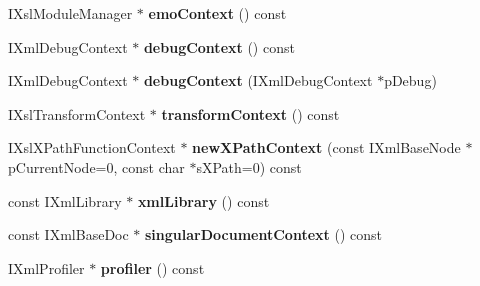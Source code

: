 \begin{DoxyCompactItemize}
\item 
\hypertarget{classgeneral__server_1_1QueryEnvironment_a128e180237d71a0d4919be2be7468f05}{\-I\-Xsl\-Module\-Manager $\ast$ {\bfseries emo\-Context} () const }\label{classgeneral__server_1_1QueryEnvironment_a128e180237d71a0d4919be2be7468f05}

\item 
\hypertarget{classgeneral__server_1_1QueryEnvironment_a4bb9bbd6249202f4fd58df2c72ed5f75}{\-I\-Xml\-Debug\-Context $\ast$ {\bfseries debug\-Context} () const }\label{classgeneral__server_1_1QueryEnvironment_a4bb9bbd6249202f4fd58df2c72ed5f75}

\item 
\hypertarget{classgeneral__server_1_1QueryEnvironment_af2bd83aeed31f536b3fc9d839cd812f8}{\-I\-Xml\-Debug\-Context $\ast$ {\bfseries debug\-Context} (\-I\-Xml\-Debug\-Context $\ast$p\-Debug)}\label{classgeneral__server_1_1QueryEnvironment_af2bd83aeed31f536b3fc9d839cd812f8}

\item 
\hypertarget{classgeneral__server_1_1QueryEnvironment_a75d567a5714bf37268b0d677b1d49041}{\-I\-Xsl\-Transform\-Context $\ast$ {\bfseries transform\-Context} () const }\label{classgeneral__server_1_1QueryEnvironment_a75d567a5714bf37268b0d677b1d49041}

\item 
\hypertarget{classgeneral__server_1_1QueryEnvironment_a36994b58b83c51a1abd9ba9140cf0a9d}{\-I\-Xsl\-X\-Path\-Function\-Context $\ast$ {\bfseries new\-X\-Path\-Context} (const \-I\-Xml\-Base\-Node $\ast$p\-Current\-Node=0, const char $\ast$s\-X\-Path=0) const }\label{classgeneral__server_1_1QueryEnvironment_a36994b58b83c51a1abd9ba9140cf0a9d}

\item 
\hypertarget{classgeneral__server_1_1QueryEnvironment_ae158b66ec89f7d22e942f0e387b21e63}{const \-I\-Xml\-Library $\ast$ {\bfseries xml\-Library} () const }\label{classgeneral__server_1_1QueryEnvironment_ae158b66ec89f7d22e942f0e387b21e63}

\item 
\hypertarget{classgeneral__server_1_1QueryEnvironment_a54831f0f41cf3768f7ebb8ad7ae4e1fb}{const \-I\-Xml\-Base\-Doc $\ast$ {\bfseries singular\-Document\-Context} () const }\label{classgeneral__server_1_1QueryEnvironment_a54831f0f41cf3768f7ebb8ad7ae4e1fb}

\item 
\hypertarget{classgeneral__server_1_1QueryEnvironment_aceeb0119c25001f7cbacd4c28e76388a}{\-I\-Xml\-Profiler $\ast$ {\bfseries profiler} () const }\label{classgeneral__server_1_1QueryEnvironment_aceeb0119c25001f7cbacd4c28e76388a}


\end{DoxyCompactItemize}
